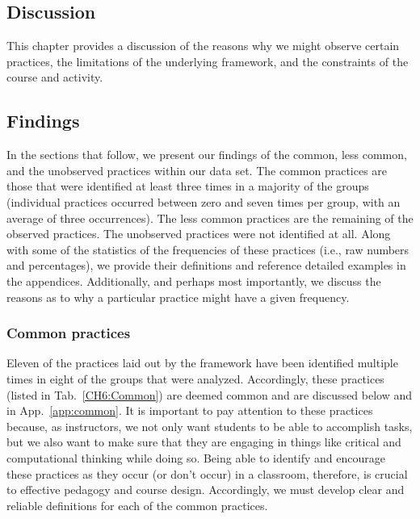 \documentclass{msuphddissertation}
\begin{document}
\begin{doublespace}

\chapter{Discussion}\label{CH6:Discussion}

This chapter provides a discussion of the reasons why we might observe certain practices, the limitations of the underlying framework, and the constraints of the course and activity.

\section{Findings}\label{CH6:Findings}

In the sections that follow, we present our findings of the common, less common, and the unobserved practices within our data set.  The common practices are those that were identified at least three times in a majority of the groups (individual practices occurred between zero and seven times per group, with an average of three occurrences).  The less common practices are the remaining of the observed practices.  The unobserved practices were not identified at all.  Along with some of the statistics of the frequencies of these practices (i.e., raw numbers and percentages), we provide their definitions and reference detailed examples in the appendices.  Additionally, and perhaps most importantly, we discuss the reasons as to why a particular practice might have a given frequency.

\subsection{Common practices}\label{CH6:CommonPractices}

Eleven of the practices laid out by the framework have been identified multiple times in eight of the groups that were analyzed.  Accordingly, these practices (listed in Tab.~\ref{CH6:Common}) are deemed common and are discussed below and in App.~\ref{app:common}.  It is important to pay attention to these practices because, as instructors, we not only want students to be able to accomplish tasks, but we also want to make sure that they are engaging in things like critical and computational thinking while doing so.  Being able to identify and encourage these practices as they occur (or  don't occur) in a classroom, therefore, is crucial to effective pedagogy and course design.  Accordingly, we must develop clear and reliable definitions for each of the common practices.


\end{doublespace}
\end{document}
